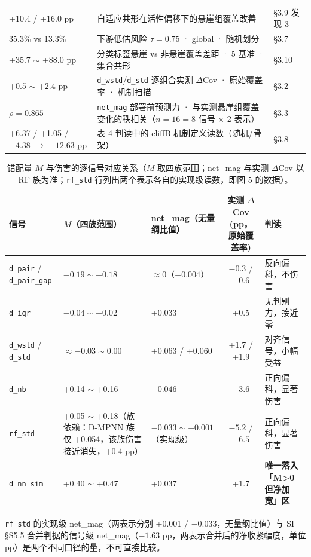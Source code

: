 \documentclass[UTF8, 11pt, a4paper]{ctexart}
\newcommand{\sig}[1]{\texttt{#1}}
\begin{document}
\begin{table}[htbp]
\begin{tabularx}{\textwidth}{@{} p{4.4cm} X p{1.9cm} @{}}
    +10.4 / +16.0 pp & 自适应共形在活性偏移下的悬崖组覆盖改善 & §3.9 发现 3 \\
    35.3\% vs 13.3\% & 下游低估风险 $\tau=0.75$ · global · 随机划分 & §3.7 \\
    +35.7 $\sim$ +88.0 pp & 分类标签悬崖 vs 非悬崖覆盖差距 · 5 基准 · 集合共形 & §3.10 \\
    +0.5 $\sim$ +2.4 pp & \sig{d\_wstd}/\sig{d\_std} 逐组合实测 $\Delta$Cov · 原始覆盖率 · 机制扫描 & §3.2 \\
    $\rho = 0.865$ & \sig{net\_mag} 部署前预测力 · 与实测悬崖组覆盖变化的秩相关（$n=16 = 8$ 信号 $\times$ 2 表示） & §3.3 \\
    +6.37 / +1.05 / $-4.38$ $\to$ $-12.63$ pp & 表 4 判读中的 cliffB 机制定义读数（随机/骨架） & §3.8 \\
    \bottomrule
  \end{tabularx}
\end{table}

\begin{table}[htbp]
  \centering
  \caption{错配量 $M$ 与伤害的逐信号对应关系（$M$ 取四族范围；net\_mag 与实测 $\Delta$Cov 以 RF 族为准；\sig{rf\_std} 行列出两个表示各自的实现级读数，即图 5 的数据）。}
  \label{tab:misalign}
  \begin{threeparttable}
  \begin{tabularx}{\textwidth}{@{} l X X c X @{}}
    \toprule
    信号 & $M$（四族范围） & net\_mag（无量纲比值） & 实测 $\Delta$Cov (pp，原始覆盖率) & 判读 \\
    \midrule
    \sig{d\_pair} / \sig{d\_pair\_gap} & $-0.19 \sim -0.18$ & $\approx 0$（$-0.004$） & $-0.3$ / $-0.6$ & 反向偏科，不伤害 \\
    \sig{d\_iqr}             & $-0.04 \sim -0.02$ & +0.033 & +0.5 & 无判别力，接近零 \\
    \sig{d\_wstd} / \sig{d\_std} & $\approx -0.03 \sim 0.00$ & +0.063 / +0.060 & +1.7 / +1.9 & 对齐信号，小幅受益 \\
    \sig{d\_nb}              & +0.14 $\sim$ +0.16 & $-0.046$ & $-3.6$ & 正向偏科，显著伤害 \\
    \sig{rf\_std}            & +0.05 $\sim$ +0.18（族依赖：D-MPNN 族仅 +0.054，该族伤害接近消失，+0.4 pp） & $-0.033 \sim +0.001$（实现级）\tnote{*} & $-5.2$ / $-6.5$ & 正向偏科，显著伤害 \\
    \sig{d\_nn\_sim}         & +0.40 $\sim$ +0.47 & +0.037 & +1.7 & \textbf{唯一落入「M>0 但净加宽」区} \\
    \bottomrule
  \end{tabularx}
  \begin{tablenotes}\footnotesize
    \item[*] \sig{rf\_std} 的实现级 net\_mag（两表示分别 +0.001 / $-0.033$，无量纲比值）与 SI §S5.5 合并判据的信号级 net\_mag（$-1.63$ pp，两表示合并后的净收紧幅度，单位 pp）是两个不同口径的量，不可直接比较。
  \end{tablenotes}
  \end{threeparttable}
\end{table}
\end{document}
